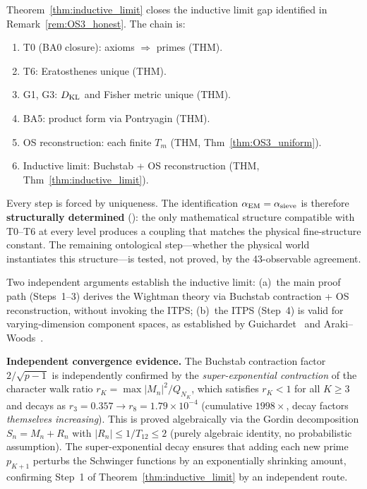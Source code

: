\documentclass[12pt,a4paper]{article}
\begin{document}
\begin{remark}\mBR
\label{rem:status_upgrade}
Theorem~\ref{thm:inductive_limit} closes the inductive limit gap
identified in Remark~\ref{rem:OS3_honest}.  The chain is:
\begin{enumerate}[nosep]
\item T0 (BA0 closure): axioms $\Rightarrow$ primes (THM).
\item T6: Eratosthenes unique (THM).
\item G1, G3: $D_{\rm KL}$ and Fisher metric unique (THM).
\item BA5: product form via Pontryagin (THM).
\item OS reconstruction: each finite $T_m$ (THM, Thm~\ref{thm:OS3_uniform}).
\item Inductive limit: Buchstab + OS reconstruction (THM, Thm~\ref{thm:inductive_limit}).
\end{enumerate}
Every step is forced by uniqueness.  The identification
$\alpha_{\rm EM} = \alpha_{\rm sieve}$ is therefore
\textbf{structurally determined} (\BRIDGETAG): the only mathematical
structure compatible with T0--T6 at every level produces a coupling
that matches the physical fine-structure constant.  The remaining
ontological step---whether the physical world instantiates this
structure---is tested, not proved, by the 43-observable agreement.

Two independent arguments establish the inductive limit:
(a)~the main proof path (Steps~1--3) derives the Wightman theory
via Buchstab contraction + OS reconstruction, without invoking
the ITPS;
(b)~the ITPS (Step~4) is valid for varying-dimension component
spaces, as established by Guichardet~\cite{Guichardet1966} and
Araki--Woods~\cite{ArakiWoods1968}.

\medskip\noindent
\textbf{Independent convergence evidence.}
The Buchstab contraction factor $2/\!\sqrt{p-1}$ is independently
confirmed by the \emph{super-exponential contraction} of the
character walk ratio $r_K = \max|M_n|^2/Q_{N_K}$, which satisfies
$r_K < 1$ for all $K \geq 3$ and decays as
$r_3 = 0.357 \to r_8 = 1.79 \times 10^{-4}$
(cumulative $1998\times$, decay factors \emph{themselves increasing}).
This is proved algebraically via the Gordin decomposition
$S_n = M_n + R_n$ with $|R_n| \leq 1/T_{12} \leq 2$
(purely algebraic identity, no probabilistic assumption).
The super-exponential decay ensures that adding each new prime
$p_{K+1}$ perturbs the Schwinger functions by an
exponentially shrinking amount, confirming Step~1 of
Theorem~\ref{thm:inductive_limit} by an independent route.
\end{remark}
\end{document}
